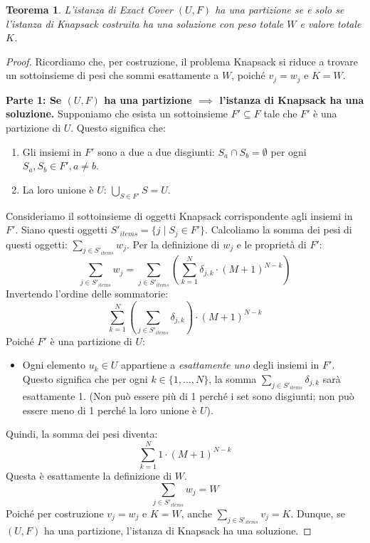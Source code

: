 \documentclass[a4paper]{article}
\newtheorem{theorem}{Teorema}
\begin{document}
\begin{theorem}
L'istanza di Exact Cover $(U, F)$ ha una partizione se e solo se l'istanza di Knapsack costruita ha una soluzione con peso totale $W$ e valore totale $K$.
\end{theorem}
\begin{proof}
Ricordiamo che, per costruzione, il problema Knapsack si riduce a trovare un sottoinsieme di pesi che sommi esattamente a $W$, poiché $v_j=w_j$ e $K=W$.

\textbf{Parte 1: Se $(U, F)$ ha una partizione $\implies$ l'istanza di Knapsack ha una soluzione.}
Supponiamo che esista un sottoinsieme $F' \subseteq F$ tale che $F'$ è una partizione di $U$. Questo significa che:
\begin{enumerate}
    \item Gli insiemi in $F'$ sono a due a due disgiunti: $S_a \cap S_b = \emptyset$ per ogni $S_a, S_b \in F', a \neq b$.
    \item La loro unione è $U$: $\bigcup_{S \in F'} S = U$.
\end{enumerate}
Consideriamo il sottoinsieme di oggetti Knapsack corrispondente agli insiemi in $F'$. Siano questi oggetti $S'_{items} = \{j \mid S_j \in F'\}$.
Calcoliamo la somma dei pesi di questi oggetti: $\sum_{j \in S'_{items}} w_j$.
Per la definizione di $w_j$ e le proprietà di $F'$:
\[ \sum_{j \in S'_{items}} w_j = \sum_{j \in S'_{items}} \left( \sum_{k=1}^N \delta_{j,k} \cdot (M+1)^{N-k} \right) \]
Invertendo l'ordine delle sommatorie:
\[ \sum_{k=1}^N \left( \sum_{j \in S'_{items}} \delta_{j,k} \right) \cdot (M+1)^{N-k} \]
Poiché $F'$ è una partizione di $U$:
\begin{itemize}
    \item Ogni elemento $u_k \in U$ appartiene a \emph{esattamente uno} degli insiemi in $F'$. Questo significa che per ogni $k \in \{1, \ldots, N\}$, la somma $\sum_{j \in S'_{items}} \delta_{j,k}$ sarà esattamente 1. (Non può essere più di 1 perché i set sono disgiunti; non può essere meno di 1 perché la loro unione è $U$).
\end{itemize}
Quindi, la somma dei pesi diventa:
\[ \sum_{k=1}^N 1 \cdot (M+1)^{N-k} \]
Questa è esattamente la definizione di $W$.
\[ \sum_{j \in S'_{items}} w_j = W \]
Poiché per costruzione $v_j=w_j$ e $K=W$, anche $\sum_{j \in S'_{items}} v_j = K$.
Dunque, se $(U, F)$ ha una partizione, l'istanza di Knapsack ha una soluzione.


\end{proof}
\end{document}

